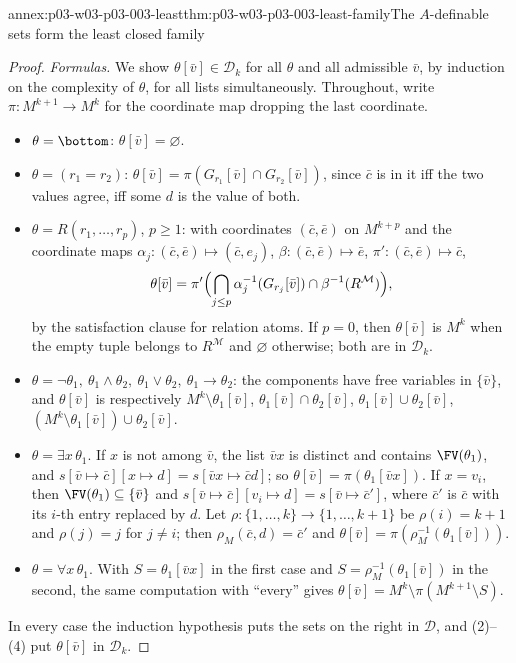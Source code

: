 \begin{annexitem}{annex:p03-w03-p03-003-least}{thm:p03-w03-p03-003-least-family}{The \(A\)-definable sets form the least closed family}
\begin{proof}
\emph{Formulas.}  We show \(\theta[\bar v]\in\mathcal D_k\) for all
\(\theta\) and all admissible \(\bar v\), by induction on the complexity of
\(\theta\), for all lists simultaneously.  Throughout, write
\(\pi:M^{k+1}\to M^k\) for the coordinate map dropping the last coordinate.
\begin{itemize}
 \item \(\theta=\bottom\): \(\theta[\bar v]=\varnothing\).
 \item \(\theta=(r_1=r_2)\): \(\theta[\bar v]=\pi(G_{r_1}[\bar v]\cap
       G_{r_2}[\bar v])\), since \(\bar c\) is in it iff the two values agree,
       iff some \(d\) is the value of both.
 \item \(\theta=R(r_1,\ldots,r_p)\), \(p\geq1\): with coordinates
       \((\bar c,\bar e)\) on \(M^{k+p}\) and the coordinate maps
       \(\alpha_j:(\bar c,\bar e)\mapsto(\bar c,e_j)\),
       \(\beta:(\bar c,\bar e)\mapsto\bar e\),
       \(\pi':(\bar c,\bar e)\mapsto\bar c\),
       \[
        \theta[\bar v]=\pi'\Bigl(\bigcap_{j\leq p}
          \alpha_j^{-1}(G_{r_j}[\bar v])\cap\beta^{-1}(R^{\mathcal M})\Bigr),
       \]
       by the satisfaction clause for relation atoms.  If \(p=0\), then
       \(\theta[\bar v]\) is \(M^k\) when the empty tuple belongs to
       \(R^{\mathcal M}\) and \(\varnothing\) otherwise; both are in
       \(\mathcal D_k\).
 \item \(\theta=\neg\theta_1,\ \theta_1\land\theta_2,\ \theta_1\lor\theta_2,
       \ \theta_1\to\theta_2\): the components have free variables in
       \(\{\bar v\}\), and \(\theta[\bar v]\) is respectively
       \(M^k\setminus\theta_1[\bar v]\),
       \(\theta_1[\bar v]\cap\theta_2[\bar v]\),
       \(\theta_1[\bar v]\cup\theta_2[\bar v]\),
       \((M^k\setminus\theta_1[\bar v])\cup\theta_2[\bar v]\).
 \item \(\theta=\exists x\,\theta_1\).  If \(x\) is not among \(\bar v\),
       the list \(\bar vx\) is distinct and contains \(\FV(\theta_1)\), and
       \(s[\bar v\mapsto\bar c][x\mapsto d]=s[\bar vx\mapsto\bar cd]\); so
       \(\theta[\bar v]=\pi(\theta_1[\bar vx])\).  If \(x=v_i\), then
       \(\FV(\theta_1)\subseteq\{\bar v\}\) and
       \(s[\bar v\mapsto\bar c][v_i\mapsto d]=s[\bar v\mapsto\bar c']\), where
       \(\bar c'\) is \(\bar c\) with its \(i\)-th entry replaced by \(d\).
       Let \(\rho:\{1,\ldots,k\}\to\{1,\ldots,k+1\}\) be \(\rho(i)=k+1\) and
       \(\rho(j)=j\) for \(j\neq i\); then \(\rho_M(\bar c,d)=\bar c'\) and
       \(\theta[\bar v]=\pi(\rho_M^{-1}(\theta_1[\bar v]))\).
 \item \(\theta=\forall x\,\theta_1\).  With
       \(S=\theta_1[\bar vx]\) in the first case and
       \(S=\rho_M^{-1}(\theta_1[\bar v])\) in the second, the same
       computation with ``every'' gives
       \(\theta[\bar v]=M^k\setminus\pi(M^{k+1}\setminus S)\).
\end{itemize}
In every case the induction hypothesis puts the sets on the right in
\(\mathcal D\), and (2)--(4) put \(\theta[\bar v]\) in \(\mathcal D_k\).


\end{proof}
\end{annexitem}
